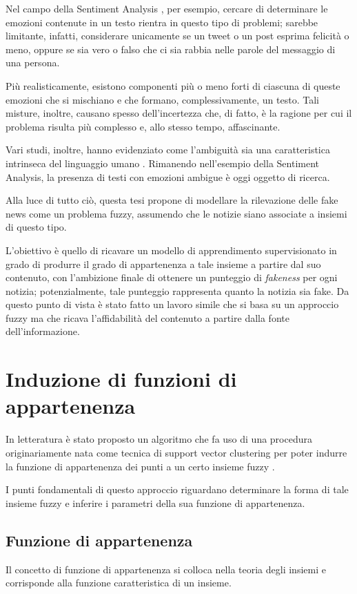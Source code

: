 \documentclass[12pt]{report}
\theoremstyle{definition}
\begin{document}
Nel campo della Sentiment Analysis \cite{18, 25}, per esempio, cercare di determinare le emozioni contenute in un testo rientra in questo tipo di problemi; sarebbe limitante, infatti, considerare unicamente se un tweet o un post esprima felicità o meno, oppure se sia vero o falso che ci sia rabbia nelle parole del messaggio di una persona.

Più realisticamente, esistono componenti più o meno forti di ciascuna di queste emozioni che si mischiano e che formano, complessivamente, un testo.
Tali misture, inoltre, causano spesso dell'incertezza che, di fatto, è la ragione per cui il problema risulta più complesso e, allo stesso tempo, affascinante.

Vari studi, inoltre, hanno evidenziato come l'ambiguità sia una caratteristica intrinseca del linguaggio umano \cite{26, 27}.
Rimanendo nell'esempio della Sentiment Analysis, la presenza di testi con emozioni ambigue è oggi oggetto di ricerca.

Alla luce di tutto ciò, questa tesi propone di modellare la rilevazione delle fake news come un problema fuzzy, assumendo che le notizie siano associate a insiemi di questo tipo.

L'obiettivo è quello di ricavare un modello di apprendimento supervisionato in grado di produrre il grado di appartenenza a tale insieme a partire dal suo contenuto, con l'ambizione finale di ottenere un punteggio di \textit{fakeness} per ogni notizia;
potenzialmente, tale punteggio rappresenta quanto la notizia sia fake. Da questo punto di vista è stato fatto un lavoro simile \cite{35} che si basa su un approccio fuzzy ma che ricava l'affidabilità del contenuto a partire dalla fonte dell'informazione.

\section{Induzione di funzioni di appartenenza} \label{induzione}
In letteratura è stato proposto un algoritmo che fa uso di una procedura originariamente nata come tecnica di support vector clustering per poter indurre la funzione di appartenenza dei punti a un certo insieme fuzzy \cite{1}.

I punti fondamentali di questo approccio riguardano determinare la forma di tale insieme fuzzy e inferire i parametri della sua funzione di appartenenza.

\subsection{Funzione di appartenenza} \label{membership}
Il concetto di funzione di appartenenza si colloca nella teoria degli insiemi e corrisponde alla funzione caratteristica di un insieme.
\end{document}
